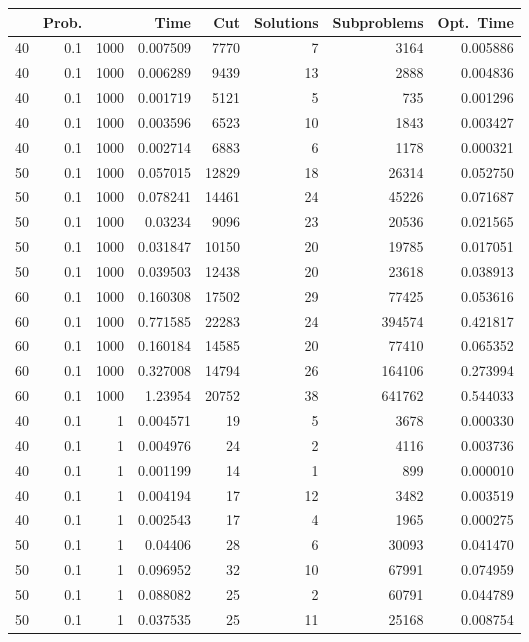 \documentclass[a4paper,11pt]{article}
\begin{document}
\begin{table}
\begin{center}
\begin{tabular}{|rrr|r|r|rr|r|}
\hline
 & Prob. &  & Time & Cut & Solutions & Subproblems & Opt.\ Time \\
\hline
40 & 0.1 & 1000 & 0.007509 & 7770 & 7 & 3164 & 0.005886 \\
40 & 0.1 & 1000 & 0.006289 & 9439 & 13 & 2888 & 0.004836 \\
40 & 0.1 & 1000 & 0.001719 & 5121 & 5 & 735 & 0.001296 \\
40 & 0.1 & 1000 & 0.003596 & 6523 & 10 & 1843 & 0.003427 \\
40 & 0.1 & 1000 & 0.002714 & 6883 & 6 & 1178 & 0.000321 \\
50 & 0.1 & 1000 & 0.057015 & 12829 & 18 & 26314 & 0.052750 \\
50 & 0.1 & 1000 & 0.078241 & 14461 & 24 & 45226 & 0.071687 \\
50 & 0.1 & 1000 & 0.03234 & 9096 & 23 & 20536 & 0.021565 \\
50 & 0.1 & 1000 & 0.031847 & 10150 & 20 & 19785 & 0.017051 \\
50 & 0.1 & 1000 & 0.039503 & 12438 & 20 & 23618 & 0.038913 \\
60 & 0.1 & 1000 & 0.160308 & 17502 & 29 & 77425 & 0.053616 \\
60 & 0.1 & 1000 & 0.771585 & 22283 & 24 & 394574 & 0.421817 \\
60 & 0.1 & 1000 & 0.160184 & 14585 & 20 & 77410 & 0.065352 \\
60 & 0.1 & 1000 & 0.327008 & 14794 & 26 & 164106 & 0.273994 \\
60 & 0.1 & 1000 & 1.23954 & 20752 & 38 & 641762 & 0.544033 \\
\hline
40 & 0.1 & 1 & 0.004571 & 19 & 5 & 3678 & 0.000330 \\
40 & 0.1 & 1 & 0.004976 & 24 & 2 & 4116 & 0.003736 \\
40 & 0.1 & 1 & 0.001199 & 14 & 1 & 899 & 0.000010 \\
40 & 0.1 & 1 & 0.004194 & 17 & 12 & 3482 & 0.003519 \\
40 & 0.1 & 1 & 0.002543 & 17 & 4 & 1965 & 0.000275 \\
50 & 0.1 & 1 & 0.04406 & 28 & 6 & 30093 & 0.041470 \\
50 & 0.1 & 1 & 0.096952 & 32 & 10 & 67991 & 0.074959 \\
50 & 0.1 & 1 & 0.088082 & 25 & 2 & 60791 & 0.044789 \\
50 & 0.1 & 1 & 0.037535 & 25 & 11 & 25168 & 0.008754 \\

\end{tabular}
\end{center}
\end{table}
\end{document}

